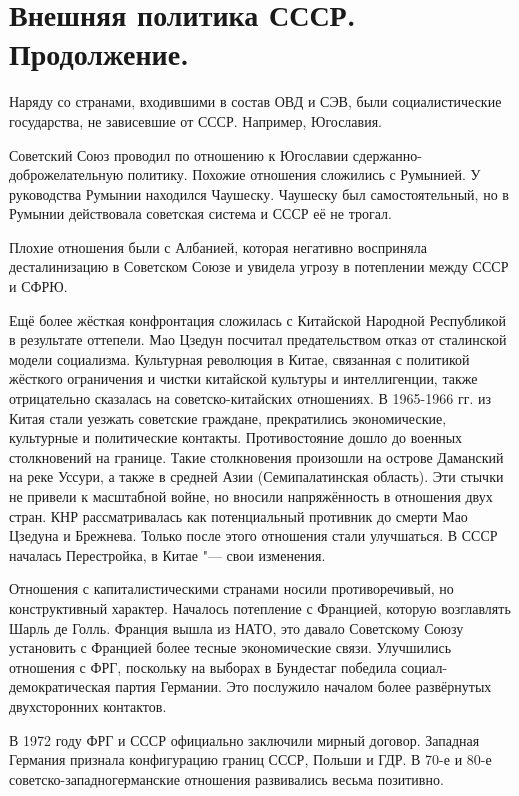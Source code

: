 \documentclass{article}
\begin{document}
\section{Внешняя политика СССР. Продолжение.}
Наряду со странами, входившими в состав ОВД и СЭВ, были социалистические государства, не зависевшие от СССР. Например, Югославия.

Советский Союз проводил по отношению к Югославии сдержанно-\\доброжелательную политику. Похожие отношения сложились с Румынией. У руководства Румынии находился Чаушеску. Чаушеску был самостоятельный, но в Румынии действовала советская система и СССР её не трогал.

Плохие отношения были с Албанией, которая негативно восприняла десталинизацию в Советском Союзе и увидела угрозу в потеплении между СССР и СФРЮ.

Ещё более жёсткая конфронтация сложилась с Китайской Народной Республикой в результате оттепели. Мао Цзедун посчитал предательством отказ от сталинской модели социализма. Культурная революция в Китае, связанная с политикой жёсткого ограничения и чистки китайской культуры и интеллигенции, также отрицательно сказалась на советско-китайских отношениях. В 1965-1966 гг. из Китая стали уезжать советские граждане, прекратились экономические, культурные и политические контакты. Противостояние дошло до военных столкновений на границе. Такие столкновения произошли на острове Даманский на реке Уссури, а также в средней Азии (Семипалатинская область). Эти стычки не привели к масштабной войне, но вносили напряжённость в отношения двух стран. КНР рассматривалась как потенциальный противник до смерти Мао Цзедуна и Брежнева. Только после этого отношения стали улучшаться. В СССР началась Перестройка, в Китае "--- свои изменения.

Отношения с капиталистическими странами носили противоречивый, но конструктивный характер. Началось потепление с Францией, которую возглавлять Шарль де Голль. Франция вышла из НАТО, это давало Советскому Союзу установить с Францией более тесные экономические связи. Улучшились отношения с ФРГ, поскольку на выборах в Бундестаг победила социал-демократическая партия Германии. Это послужило началом более развёрнутых двухсторонних контактов.

В 1972 году ФРГ и СССР официально заключили мирный договор. Западная Германия признала конфигурацию границ СССР, Польши и ГДР. В 70-е и 80-е советско-западногерманские отношения развивались весьма позитивно.
\end{document}
